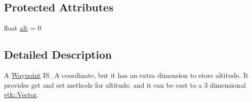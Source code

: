 \subsection*{Protected Attributes}
\begin{DoxyCompactItemize}
\item 
float \hyperlink{classetk_1_1_waypoint_a9602058eaab556f8db26b663fae161e9}{alt} = 0
\end{DoxyCompactItemize}


\subsection{Detailed Description}
A \hyperlink{classetk_1_1_waypoint}{Waypoint} I\-S\-\_\-\-A coordinate, but it has an extra dimension to store altitude. It provides get and set methods for altitude, and it can be cast to a 3 dimensional \hyperlink{classetk_1_1_vector}{etk\-::\-Vector}. 


